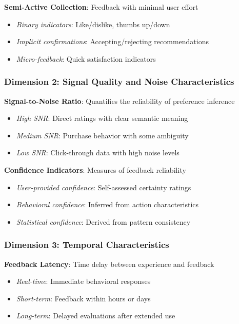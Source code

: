 \textbf{Semi-Active Collection}: Feedback with minimal user effort
\begin{itemize}
    \item \textit{Binary indicators}: Like/dislike, thumbs up/down
    \item \textit{Implicit confirmations}: Accepting/rejecting recommendations
    \item \textit{Micro-feedback}: Quick satisfaction indicators
\end{itemize}

\subsubsection{Dimension 2: Signal Quality and Noise Characteristics}

\textbf{Signal-to-Noise Ratio}: Quantifies the reliability of preference inference
\begin{itemize}
    \item \textit{High SNR}: Direct ratings with clear semantic meaning
    \item \textit{Medium SNR}: Purchase behavior with some ambiguity
    \item \textit{Low SNR}: Click-through data with high noise levels
\end{itemize}

\textbf{Confidence Indicators}: Measures of feedback reliability
\begin{itemize}
    \item \textit{User-provided confidence}: Self-assessed certainty ratings
    \item \textit{Behavioral confidence}: Inferred from action characteristics
    \item \textit{Statistical confidence}: Derived from pattern consistency
\end{itemize}

\subsubsection{Dimension 3: Temporal Characteristics}

\textbf{Feedback Latency}: Time delay between experience and feedback
\begin{itemize}
    \item \textit{Real-time}: Immediate behavioral responses
    \item \textit{Short-term}: Feedback within hours or days
    \item \textit{Long-term}: Delayed evaluations after extended use
\end{itemize}

